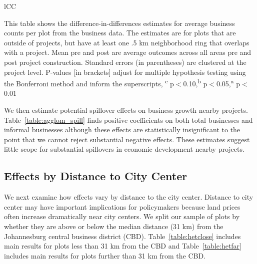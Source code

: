 \documentclass[12pt]{article}
\newcommand{\regtextfirst}{
Mean pre and post are average outcomes across all areas pre and post project construction.  Standard errors (in parentheses) are clustered at the project level.  P-values [in brackets] adjust for multiple hypothesis testing using the Bonferroni method and inform the superscripts, \textsuperscript{c} p$<$0.10,\textsuperscript{b} p$<$0.05,\textsuperscript{a} p$<$0.01 \,\,
}
\newcommand{\rv}{}
\begin{document}
\begin{table}[h!]
\small
\centering
\caption{Spillover Effects on Economic Outcomes}\label{table:agglom_spill}
\vspace{-2mm}
\begin{threeparttable}
\begin{tabular}{lCC}
\toprule

\bottomrule
\end{tabular}
\begin{tablenotes}
\item \footnotesize 
This table shows the difference-in-differences estimates for average business counts per plot from the business data.  The estimates are for plots that are outside of projects, but have at least one .5 km neighborhood ring that overlaps with a project.  \regtextfirst
\end{tablenotes}
\end{threeparttable}
\end{table}



\rv{We then estimate potential spillover effects on business growth nearby projects.  Table~\ref{table:agglom_spill} finds positive coefficients on both total businesses and informal businesses although these effects are statistically insignificant to the point that we cannot reject substantial negative effects.  These estimates suggest little scope for substantial spillovers in economic development nearby projects.}







\subsection{Effects by Distance to City Center}\label{section:heterogeneity}

\rv{We next examine how effects vary by distance to the city center.  Distance to city center may have important implications for policymakers because land prices often increase dramatically near city centers.  We split our sample of plots by whether they are above or below the median distance (31 km) from the Johannesburg central business district (CBD).  Table~\ref{table:hetclose} includes main results for plots less than 31 km from the CBD and Table~\ref{table:hetfar} includes main results for plots further than 31 km from the CBD.}
\end{document}
